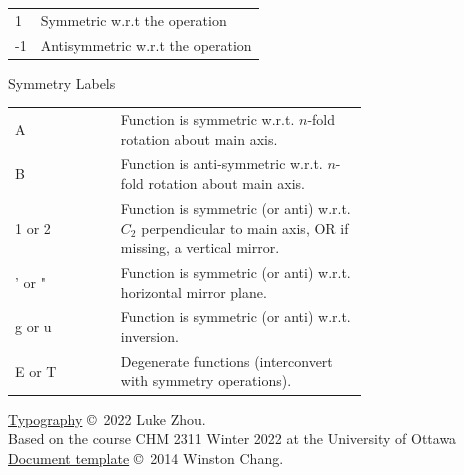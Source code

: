 \documentclass[10pt,landscape]{article}
\newcommand{\tableindent}{\hspace{1.5em}}
\begin{document}
\begin{multicols}{3}
\begin{tabular}{@{\tableindent}ll@{}}
	1 & Symmetric w.r.t the operation \\
	-1 & Antisymmetric w.r.t the operation \\
\end{tabular}

Symmetry Labels
%
\renewcommand{\arraystretch}{1.4}
\begin{tabular}{@{\tableindent}lm{0.7\linewidth}@{}}
	A & Function is symmetric w.r.t. $n$-fold rotation about main axis. \\
	B & Function is anti-symmetric w.r.t. $n$-fold rotation about main axis. \\
	1 or 2 & Function is symmetric (or anti) w.r.t. $C_2$ perpendicular to main axis, OR if missing, a vertical mirror. \\
	' or " & Function is symmetric (or anti) w.r.t. horizontal mirror plane. \\
	g or u & Function is symmetric (or anti) w.r.t. inversion. \\
	E or T & Degenerate functions (interconvert with symmetry operations). \\
\end{tabular}
\renewcommand{\arraystretch}{1}

\hrulefill


\scriptsize

\href{https://github.com/zhouluke/PhysicsFormulas}{Typography}  \copyright\ 2022 Luke Zhou. \\
Based on the course CHM 2311 Winter 2022 at the University of Ottawa \\
\href{http://wch.github.io/latexsheet/}{Document template}  \copyright\ 2014 Winston Chang.


\end{multicols}
\end{document}
